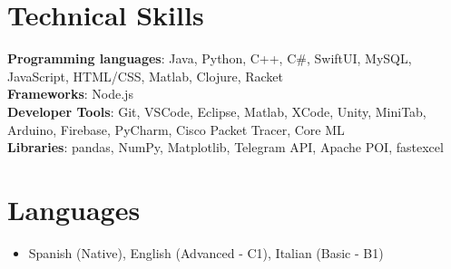 \documentclass[letterpaper,11pt]{article}
\newcommand{\resumeItem}[1]{
  \item\small{
    {#1 \vspace{-2pt}}
  }
}
\newcommand{\resumeItemListStart}{\begin{itemize}}
\newcommand{\resumeItemListEnd}{\end{itemize}\vspace{-5pt}}
\begin{document}
\section{Technical Skills}
 \begin{itemize}[leftmargin=0.15in, label={}]
    \small{\item{
     \textbf{Programming languages}{: Java, Python, C++, C\#, SwiftUI, MySQL, JavaScript, HTML/CSS, Matlab, Clojure, Racket} \\
     \textbf{Frameworks}{: Node.js} \\
     \textbf{Developer Tools}{: Git, VSCode, Eclipse, Matlab, XCode, Unity, MiniTab, Arduino, Firebase, PyCharm, Cisco Packet Tracer, Core ML} \\
     \textbf{Libraries}{: pandas, NumPy, Matplotlib, Telegram API, Apache POI, fastexcel}
    }}
 \end{itemize}

%
\section{Languages}
\resumeItemListStart
    \resumeItem{Spanish (Native), English (Advanced - C1), Italian (Basic - B1)}
\resumeItemListEnd

%
\end{document}
